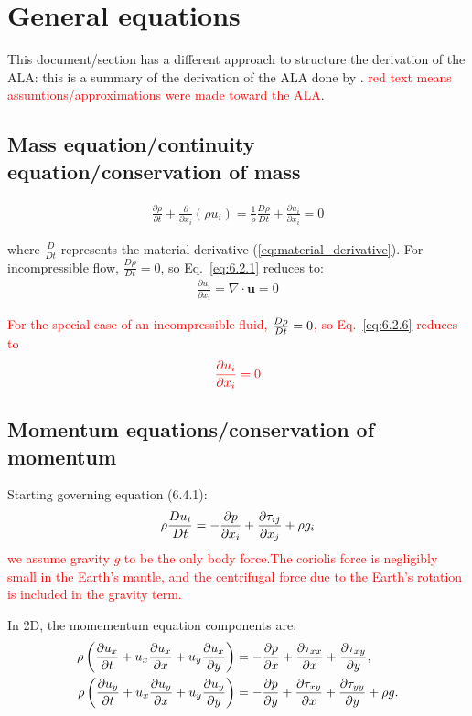 \documentclass[document.tex]{subfiles}
\begin{document}
\section{\cite{scto01} General equations}
This document/section has a different approach to structure the derivation of the ALA: 
this is a summary of the derivation of the ALA done by \cite{scto01}.
\textcolor{red}{red text means assumtions/approximations were made toward the ALA}. 
\subsection{Mass equation/continuity equation/conservation of mass}
\begin{align} \label{eq:6.2.1}
\frac{\partial \rho}{\partial t} + \frac{\partial}{\partial x_i}(\rho u_i) = 
\frac{1}{\rho}\frac{D\rho}{Dt} + \frac{\partial u_i}{\partial x_i} = 0
\end{align}

where $\frac{D}{Dt}$ represents the material derivative (\eqref{eq:material_derivative}). 
For incompressible flow, $\frac{D\rho}{Dt} = 0$, so Eq.~\eqref{eq:6.2.1} reduces to: 
\begin{align} \label{eq:6.2.6}
\frac{\partial u_i}{\partial x_i} = \nabla \cdot \textbf{u} =0
\end{align}

\textcolor{red}{For the special case of an incompressible fluid, $\frac{D \rho}{D t} = 0$, 
so Eq.~\eqref{eq:6.2.6} reduces to}
\begin{align}
    \color{red}
    \pdv{u_i}{x_i} = 0
\end{align}

\subsection{Momentum equations/conservation of momentum}
Starting governing equation (6.4.1): 
\begin{align} \label{momentum equation}
    \rho \frac{D u_i}{D t} = - \pdv{p}{x_i} + \pdv{\tau_{ij}}{x_j}+\rho g_i
\end{align}
\textcolor{red}{we assume gravity $g$ to be the only body force.The coriolis force is 
negligibly small in the Earth's mantle, and the centrifugal 
force due to the Earth's rotation is included in the gravity term.}

In 2D, the momementum equation components are: 
\begin{align}
\rho \left(
    \pdv{u_x}{t}
    + u_x \pdv{u_x}{x}
    + u_y \pdv{u_x}{y}
\right)
&= -\pdv{p}{x}
   + \pdv{\tau_{xx}}{x}
   + \pdv{\tau_{xy}}{y},
\\
\rho \left(
    \pdv{u_y}{t}
    + u_x \pdv{u_y}{x}
    + u_y \pdv{u_y}{y}
\right)
&= -\pdv{p}{y}
   + \pdv{\tau_{xy}}{x}
   + \pdv{\tau_{yy}}{y}
   + \rho g.
\end{align}
\end{document}
